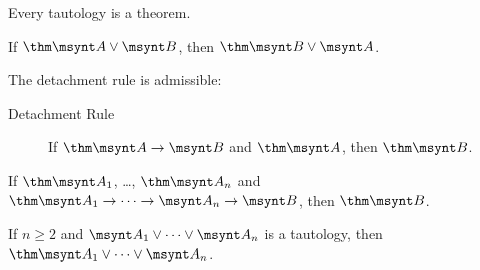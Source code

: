 \begin{corollary}
	Every tautology is a theorem.
\end{corollary}

\begin{lemma}
	If $\thm \msynt A \lor \msynt B$, then $\thm \msynt B \lor \msynt A$.
\end{lemma}

\begin{fact}
	The detachment rule is admissible: %
	\begin{description}
		\item[Detachment Rule] If $\thm \msynt A \to \msynt B$ and 
		$\thm \msynt A$, then $\thm \msynt B$.
	\end{description}
\end{fact}

\begin{corollary}
	If $\thm \msynt A_1$, \dots, $\thm \msynt A_n$ and
	$\thm \msynt A_1\to \dots\to\msynt A_n\to\msynt B$, then
	$\thm \msynt B$.
\end{corollary}

\begin{lemma}
	If $n\ge 2$ and $\msynt A_1 \lor \dots \lor \msynt A_n$ is a tautology,
	then $\thm \msynt A_1 \lor \dots \lor \msynt A_n$.
\end{lemma}